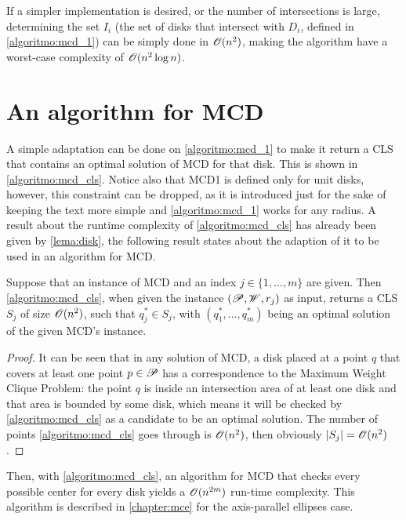 If a simpler implementation is desired, or the number of intersections is large, determining the set $I_i$ (the set of disks that intersect with $D_i$, defined in \autoref{algoritmo:mcd_1}) can be simply done in $\mathscr{O}(n^2)$, making the algorithm have a worst-case complexity of $\mathscr{O}(n^2\log{n})$.


\section{An algorithm for MCD}

A simple adaptation can be done on \autoref{algoritmo:mcd_1} to make it return a CLS that contains an optimal solution of MCD for that disk. This is shown in \autoref{algoritmo:mcd_cls}. 
Notice also that MCD1 is defined only for unit disks, however, this constraint can be dropped, as it is introduced just for the sake of keeping the text more simple and \autoref{algoritmo:mcd_1} works for any radius. A result about the runtime complexity of \autoref{algoritmo:mcd_cls} has already been given by \autoref{lema:disk}, the following result states about the adaption of it to be used in an algorithm for MCD.

\begin{lema}\label{lema:mcd}
	Suppose that an instance of MCD and an index $j\in\{1, \dots, m\}$ are given.
	Then \autoref{algoritmo:mcd_cls}, when given the instance $(\mathscr{P}, \mathscr{W}, r_j)$ as input, returns a CLS $S_j$ of size $\mathscr{O}(n^2)$, such that $q^*_j\in S_j$, with $(q^*_1, \dots, q^*_m)$ being an optimal solution of the given MCD's instance.
\end{lema}

\begin{proof}
It can be seen that in any solution of MCD, a disk placed at a point $q$ that covers at least one point $p \in \mathscr{P}$ has a correspondence to the Maximum Weight Clique Problem: the point $q$ is inside an intersection area of at least one disk and that area is bounded by some disk, which means it will be checked by \autoref{algoritmo:mcd_cls} as a candidate to be an optimal solution. The number of points \autoref{algoritmo:mcd_cls} goes through is $\mathscr{O}(n^2)$, then
obviously $|S_j|=\mathscr{O}(n^2)$.
\end{proof}

Then, with \autoref{algoritmo:mcd_cls}, an algorithm for MCD that checks every possible center for every disk yields a $\mathscr{O}(n^{2m})$ run-time complexity.
This algorithm is described in \autoref{chapter:mce} for the axis-parallel ellipses case.

